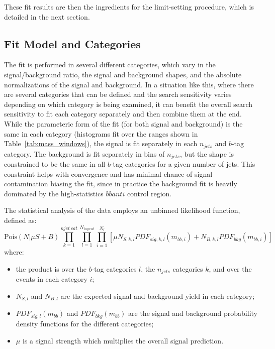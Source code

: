 These fit results are then
the ingredients for the limit-setting procedure, which is detailed in the next section.


\subsection{Fit Model and Categories}
\label{subsec:fitmodel}
The fit is performed in several different categories, which vary in the 
signal/background ratio, the signal and background shapes, and the
absolute normalizations of the signal and background.  In a situation like
this, where there are several categories that can be defined and the
search sensitivity varies depending on which category is being examined,
it can benefit the overall search sensitivity to fit each category 
separately and then combine them at the end.  While the parameteric form
of the fit (for both signal and background) is the same in each category (histograms fit over the ranges
shown in Table~\ref{tab:mass_windows}), the signal is fit separately
in each $n_{jets}$ and $b$-tag category.  The background is fit
separately in bins of $n_{jets}$, but the shape is constrained to be the
same in all $b$-tag categories for a given number of jets.  This constraint
helps with convergence and has minimal chance of signal contamination
biasing the fit, since in practice the background fit is heavily dominated
by the high-statistics $bbanti$ control region.

The statistical analysis of the data employs an unbinned likelihood
function, defined as:
\begin{equation}
\text{Pois}(N|\mu S+B) \prod_{k=1}^{njet\ cat} \prod_{l=1}^{N_{tag\ cat}} \prod_{i=1}^{N_{l}} \left[ \mu N_{S,k,l} PDF_{sig,k,l}(m_{bb,i}) + N_{B,k,l} PDF_{bkg}(m_{bb,i}) \right]
\end{equation}
where:
\begin{itemize}
\item the product is over the $b$-tag categories $l$, the $n_{jets}$ categories $k$, and over the events in each category $i$;
\item $N_{S,l}$ and $N_{B,l}$ are the expected signal and background yield in each category;
\item $PDF_{sig,l}(m_{bb})$ and $PDF_{bkg}(m_{bb})$ are the signal and background probability density functions for  the different categories;
\item $\mu$ is a signal strength which multiplies the overall signal prediction.
\end{itemize}


